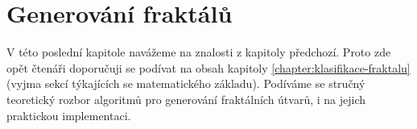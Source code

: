 \chapter{Generování fraktálů}\label{chapter:generovani-fraktalu}

V této poslední kapitole navážeme na znalosti z kapitoly předchozí. Proto zde opět čtenáři doporučuji se podívat na obsah kapitoly \ref{chapter:klasifikace-fraktalu} (vyjma sekcí týkajících se matematického základu). Podíváme se stručný teoretický rozbor algoritmů pro generování fraktálních útvarů, i na jejich praktickou implementaci.

